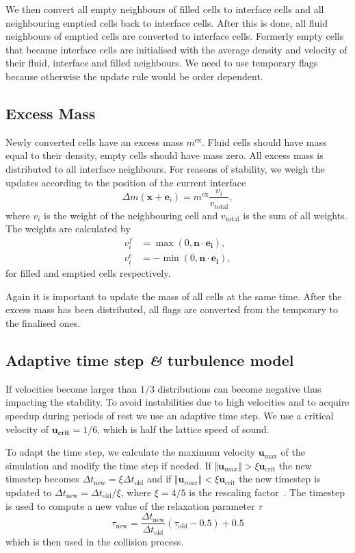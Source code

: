 \documentclass[10pt,a4paper,notitlepage]{article}
\begin{document}
We then convert all empty neighbours of filled cells to interface cells and all neighbouring emptied cells back to interface cells.
After this is done, all fluid neighbours of emptied cells are converted to interface cells.
Formerly empty cells that became interface cells are initialised with the average density and velocity of their fluid, interface and filled neighbours.
We need to use temporary flags because otherwise the update rule would be order dependent.

\subsection{Excess Mass }
Newly converted cells have an excess mass $m^{\text{ex}}$.
Fluid cells should have mass equal to their density, empty cells should have mass zero.
All excess mass is distributed to all interface neighbours.
For reasons of stability, we weigh the updates according to the position of the current interface
\begin{equation} \label{eq:exmass}
\Delta m(\bm{x}+\bm{e}_{i})=m^{\text{ex}}\frac{v_{i}}{v_{\text{total}}},
\end{equation}
where $v_{i}$ is the weight of the neighbouring cell and $v_{\text{total}}$ is the sum of all weights.
The weights are calculated by
\begin{align}
  \label{eq:excessMassWeights}
 v_i^f &=  \max(0, \bm{n} \cdot \bm{e_i}),\\
 v_i^e &= - \min(0, \bm{n} \cdot \bm{e_i}),
\end{align}
for filled and emptied cells respectively.

Again it is important to update the mass of all cells at the same time.
After the excess mass has been distributed, all flags are converted from the temporary to the finalised ones.

\subsection{Adaptive time step \textit{\&} turbulence model}
If velocities become larger than $1/3$ distributions can become negative thus impacting the stability.
To avoid instabilities due to high velocities and to acquire speedup during periods of rest we use an adaptive time step.
We use a critical velocity of $\bm{u_\text{crit}} = 1/6$, which is half the lattice speed of sound.

To adapt the time step, we calculate the maximum velocity $\bm{u}_{\text{max}}$ of the simulation and modify the time step if needed.
If $ \Vert \bm{u}_{max} \Vert > \xi \bm{u}_{\text{crit}}$ the new timestep becomes $\Delta t_{\text{new}}= \xi \Delta t_{\text{old}}$ and if 
$\Vert \bm{u}_{max} \Vert < \xi \bm{u}_\text{crit}$ the new timestep is updated to $\Delta t_{\text{new}} = \Delta t_{\text{old}} / \xi$,
where $\xi = 4/5$ is the rescaling factor~\cite{thurey2005interactive}.
The timestep is used to compute a new value of the relaxation parameter $\tau$
\begin{equation} \label{eq:omega}
\tau_{\text{new}}= \frac{\Delta t_{\text{new}}}{\Delta t_{\text{old}}} (\tau_{\text{old}}- 0.5) +0.5
\end{equation}
which is then used in the collision process.
\end{document}
